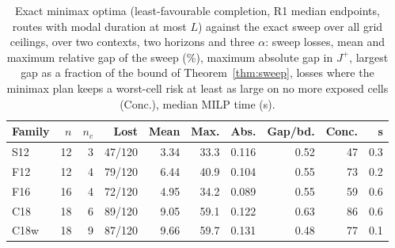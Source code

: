 \begin{table}[tb]
\centering
\caption{Exact minimax optima (least-favourable completion, R1 median endpoints, routes with modal duration at most $L$) against the exact sweep over all grid ceilings, over two contexts, two horizons and three $\alpha$: sweep losses, mean and maximum relative gap of the sweep (\%), maximum absolute gap in $J^+$, largest gap as a fraction of the bound of Theorem~\ref{thm:sweep}, losses where the minimax plan keeps a worst-cell risk at least as large on no more exposed cells (Conc.), median MILP time (s).}
\label{tab:minimax}
\scriptsize\setlength{\tabcolsep}{3pt}
\begin{tabular}{@{}lrrrrrrrrr@{}}
\toprule
Family & $n$ & $n_c$ & Lost & Mean & Max. & Abs. & Gap/bd. & Conc. & s\\\midrule
S12 & 12 & 3 & 47/120 & 3.34 & 33.3 & 0.116 & 0.52 & 47 & 0.3\\
F12 & 12 & 4 & 79/120 & 6.44 & 40.9 & 0.104 & 0.55 & 73 & 0.2\\
F16 & 16 & 4 & 72/120 & 4.95 & 34.2 & 0.089 & 0.55 & 59 & 0.6\\
C18 & 18 & 6 & 89/120 & 9.05 & 59.1 & 0.122 & 0.63 & 86 & 0.6\\
C18w & 18 & 9 & 87/120 & 9.66 & 59.7 & 0.131 & 0.48 & 77 & 0.1\\
\bottomrule
\end{tabular}
\end{table}
